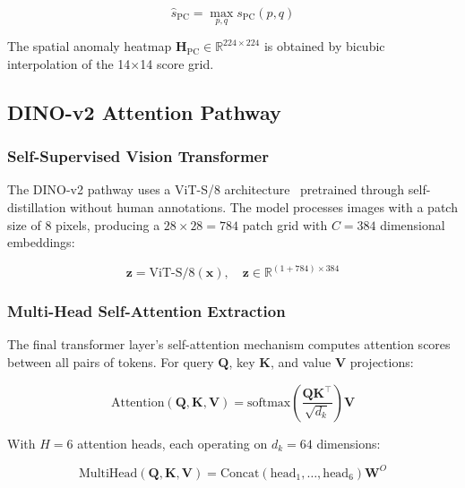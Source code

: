 \documentclass[journal]{IEEEtran}
\begin{document}
\begin{equation}
    \hat{s}_{\text{PC}} = \max_{p,q} s_{\text{PC}}(p, q)
    \label{eq:max_score}
\end{equation}

The spatial anomaly heatmap $\mathbf{H}_{\text{PC}} \in \mathbb{R}^{224 \times 224}$ is obtained by bicubic interpolation of the 14$\times$14 score grid.

\subsection{DINO-v2 Attention Pathway}
\label{sec:dino}

\subsubsection{Self-Supervised Vision Transformer}

The DINO-v2 pathway uses a ViT-S/8 architecture~\cite{caron2021emerging} pretrained through self-distillation without human annotations. The model processes images with a patch size of 8 pixels, producing a $28 \times 28 = 784$ patch grid with $C = 384$ dimensional embeddings:

\begin{equation}
    \mathbf{z} = \text{ViT-S/8}(\mathbf{x}), \quad \mathbf{z} \in \mathbb{R}^{(1+784) \times 384}
    \label{eq:dino_embed}
\end{equation}

\subsubsection{Multi-Head Self-Attention Extraction}

The final transformer layer's self-attention mechanism computes attention scores between all pairs of tokens. For query $\mathbf{Q}$, key $\mathbf{K}$, and value $\mathbf{V}$ projections:

\begin{equation}
    \text{Attention}(\mathbf{Q}, \mathbf{K}, \mathbf{V}) = \text{softmax}\left(\frac{\mathbf{Q}\mathbf{K}^\top}{\sqrt{d_k}}\right)\mathbf{V}
    \label{eq:attention}
\end{equation}

With $H = 6$ attention heads, each operating on $d_k = 64$ dimensions:

\begin{equation}
    \text{MultiHead}(\mathbf{Q}, \mathbf{K}, \mathbf{V}) = \text{Concat}(\text{head}_1, \ldots, \text{head}_6)\mathbf{W}^O
    \label{eq:multihead}
\end{equation}
\end{document}
